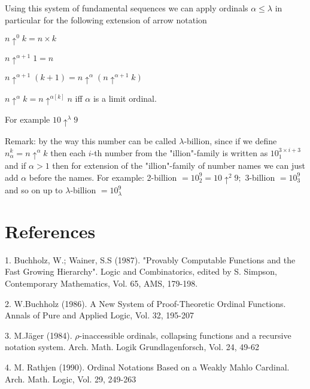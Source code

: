 \documentclass[10pt]{article}
\begin{document}
\bigskip

Using this system of fundamental sequences we can apply ordinals \(\alpha\le\lambda\) in particular for the following extension of arrow notation 

\(n\uparrow^0 k=n\times k\)

\(n\uparrow^{\alpha+1}1=n\)

\(n\uparrow^{\alpha+1}(k+1)=n\uparrow^{\alpha}(n\uparrow^{\alpha+1}k)\)

\(n\uparrow^{\alpha}k=n\uparrow^{\alpha[k]}n\) iff \(\alpha\) is a limit ordinal.

For example \(10\uparrow^{\lambda}9\)

Remark: by the way this number can be called  \(\lambda\)-billion, since if we define \(n_\alpha^k=n\uparrow^\alpha k\) then each \(i\)-th number from the "illion"-family is written as  \(10_1^{3\times i+3}\) and if \(\alpha>1\) then for extension of the "illion"-family of number names we can just add \(\alpha\) before the names.
For example: 2-billion \(=10_2^9=10\uparrow^2 9;\) 3-billion \(=10_3^9\) and so on up to  \(\lambda\)-billion \(=10_\lambda^9\)

\section{References}

1. Buchholz, W.; Wainer, S.S (1987). "Provably Computable Functions and the Fast Growing Hierarchy". Logic and Combinatorics, edited by S. Simpson, Contemporary Mathematics, Vol. 65, AMS, 179-198.

2. W.Buchholz (1986). A New System of Proof-Theoretic Ordinal Functions. Annals of Pure and Applied Logic, Vol. 32, 195-207

3. M.Jäger (1984). \(\rho\)-inaccessible ordinals, collapsing functions and a recursive notation system. Arch. Math. Logik Grundlagenforsch, Vol. 24, 49-62

4. M. Rathjen (1990). Ordinal Notations Based on a Weakly Mahlo Cardinal. Arch. Math. Logic, Vol. 29, 249-263
\end{document}
